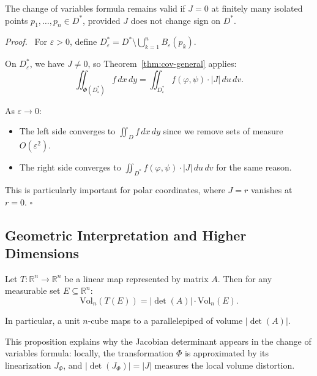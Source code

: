 \documentclass[11pt]{report}
\renewenvironment{proof}[1][Proof]{\par\noindent\textit{#1.}\ }{\hfill$\square$\par\medskip}
\newcommand{\R}{\mathbb{R}}
\begin{document}
\begin{proposition}
\label{prop:isolated-zeros}
The change of variables formula remains valid if $J = 0$ at finitely many isolated points $p_1, \ldots, p_n \in D^*$, provided $J$ does not change sign on $D^*$.
\end{proposition}

\begin{proof}
For $\varepsilon > 0$, define $D^*_\varepsilon = D^* \setminus \bigcup_{k=1}^n B_\varepsilon(p_k)$.

On $D^*_\varepsilon$, we have $J \neq 0$, so Theorem~\ref{thm:cov-general} applies:
\[
\iint_{\Phi(D^*_\varepsilon)} f \, dx \, dy = \iint_{D^*_\varepsilon} f(\varphi, \psi) \cdot |J| \, du \, dv.
\]

As $\varepsilon \to 0$:
\begin{itemize}
    \item The left side converges to $\iint_D f \, dx \, dy$ since we remove sets of measure $O(\varepsilon^2)$.
    \item The right side converges to $\iint_{D^*} f(\varphi, \psi) \cdot |J| \, du \, dv$ for the same reason.
\end{itemize}

This is particularly important for polar coordinates, where $J = r$ vanishes at $r = 0$.
\end{proof}

\subsection*{Geometric Interpretation and Higher Dimensions}

\begin{proposition}
\label{prop:det-volume}
Let $T: \R^n \to \R^n$ be a linear map represented by matrix $A$. Then for any measurable set $E \subseteq \R^n$:
\[
\text{Vol}_n(T(E)) = |\det(A)| \cdot \text{Vol}_n(E).
\]

In particular, a unit $n$-cube maps to a parallelepiped of volume $|\det(A)|$.
\end{proposition}

This proposition explains why the Jacobian determinant appears in the change of variables formula: locally, the transformation $\Phi$ is approximated by its linearization $J_\Phi$, and $|\det(J_\Phi)| = |J|$ measures the local volume distortion.
\end{document}
